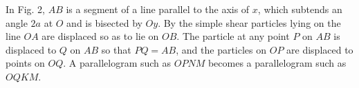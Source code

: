 In Fig. 2, \(A B\) is a segment of a line parallel to the axis of \(x\), which
subtends an angle \(2 a\) at \(O\) and is bisected by \(O y\). By the simple
shear particles lying on the line \(O A\) are displaced so as to lie on \(O
B\). The particle at any point \(P\) on \(A B\) is displaced to \(Q\) on \(A
B\) so that \(P Q=A B\), and the particles on \(O P\) are displaced to points
on \(O Q\). A parallelogram such as \(O P N M\) becomes a parallelogram such as
\(O Q K M\).

